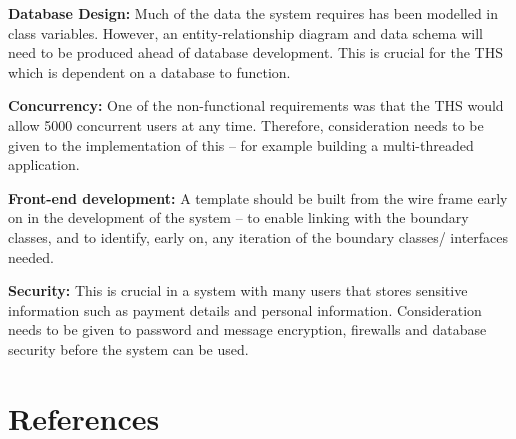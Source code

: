 \documentclass[fontsize=11pt]{extarticle}
\numberwithin{figure}{section} %
\numberwithin{table}{section}%
\begin{document}
\textbf{Database Design:} Much of the data the system requires has been
modelled in class variables. However, an entity-relationship diagram and
data schema will need to be produced ahead of database development. This
is crucial for the THS which is dependent on a database to function.

\textbf{Concurrency:} One of the non-functional requirements was that
the THS would allow 5000 concurrent users at any time. Therefore,
consideration needs to be given to the implementation of this -- for
example building a multi-threaded application.

\textbf{Front-end development:} A template should be built from the wire
frame early on in the development of the system -- to enable linking
with the boundary classes, and to identify, early on, any iteration of
the boundary classes/ interfaces needed.

\textbf{Security:} This is crucial in a system with many users that
stores sensitive information such as payment details and personal
information. Consideration needs to be given to password and message
encryption, firewalls and database security before the system can be
used.

\newpage

\hypertarget{references}{%
\section{References}\label{references}}
\end{document}
